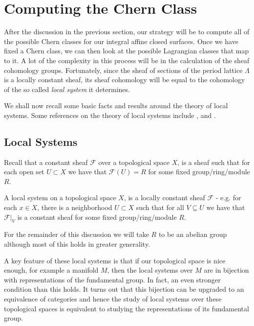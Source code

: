 \section{Computing the Chern Class}
After the discussion in the previous section, our strategy will be to compute
all of the possible Chern classes for our integral affine closed surfaces. Once
we have fixed a Chern class, we can then look at the possible Lagrangian
classes that map to it. A lot of the complexity in this process will be in the
calculation of the sheaf cohomology groups. Fortunately, since the sheaf of
sections of the period lattice $\Lambda$ is a locally constant sheaf, its sheaf
cohomology will be equal to the cohomology of the so called \emph{local system}
it determines.

We shall now recall some basic facts and results around the theory of local
systems. Some references on the theory of local systems include
\cite{ElZeinSnoussi2009}, \cite{whitehead1978elements} and
\cite{Davis2001LectureNI}.

\subsection{Local Systems}
Recall that a constant sheaf $\mathcal{F}$ over a topological space $X$, is a
sheaf such that for each open set $U \subset X$ we have that $\mathcal{F}(U) =
    R$ for some fixed group/ring/module $R$.

\begin{definition}
    A local system on a topological space $X$, is a locally constant sheaf $\mathcal{F}$ - e.g. for each $x \in X$, there is a neighborhood $U \subset X$ such that
    for all $V \subseteq U$ we have that $\mathcal{F}|_V$ is a constant sheaf for some fixed group/ring/module $R$.
\end{definition}
\begin{remark}
    For the remainder of this discussion we will take $R$ to be an abelian group although most of this holds in greater generality.
\end{remark}

A key feature of these local systems is that if our topological space is nice
enough, for example a manifold $M$, then the local systems over $M$ are in
bijection with representations of the fundamental group. In fact, an even
stronger condition than this holds. It turns out that this bijection can be
upgraded to an equivalence of categories and hence the study of local systems
over these topological spaces is equivalent to studying the representations of
its fundamental group.

